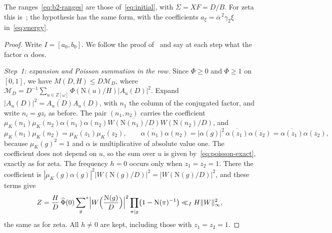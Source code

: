 \documentclass[11pt]{article}
\numberwithin{equation}{section}
\newcommand{\OO}{\mathbb Z[\omega]}
\newcommand{\N}{\mathrm N}
\newcommand{\muk}{\mu_K}
\newcommand{\ssum}{\sideset{}{^*}\sum}
\begin{document}
The ranges~\eqref{eq:b2-ranges} are those of~\eqref{eq:initial}, with $\Sigma=XF=D/B$.
For zeta this is~\cite[Proposition~4.5]{OAI1112}; the hypothesis has the same form, with the
coefficients $a_\xi=\overline\alpha^{\,2}\gamma_2\xi$ in~\eqref{eq:energy}.

\begin{proof}
Write $I=[a_0,b_0]$. We follow the proof of~\cite[Proposition~4.5]{OAI1112} and say at each
step what the factor $\alpha$ does.

\emph{Step~1: expansion and Poisson summation in the row.} Since $\Phi\ge0$ and $\Phi\ge1$
on $[0,1]$, we have $M(D,H)\le D\mathcal M_D$, where
$\mathcal M_D=D^{-1}\sum_{u\in\OO}\Phi(\N(u)/H)|A_u(D)|^2$. Expand
$|A_u(D)|^2=\overline{A_u(D)}A_u(D)$, with $n_1$ the column of the conjugated factor, and
write $n_i=gz_i$ as before. The pair $(n_1,n_2)$ carries the coefficient
$\muk(n_1)\muk(n_2)\overline{\alpha(n_1)}\alpha(n_2)\overline{W(\N(n_1)/D)}W(\N(n_2)/D)$, and
\begin{equation}\label{eq:d044}
 \muk(n_1)\muk(n_2)=\muk(z_1)\muk(z_2),\qquad
 \overline{\alpha(n_1)}\alpha(n_2)=|\alpha(g)|^2\,\overline{\alpha(z_1)}\alpha(z_2)
 =\overline{\alpha(z_1)}\alpha(z_2),
\end{equation}
because $\muk(g)^2=1$ and $\alpha$ is multiplicative of absolute value one. The coefficient
does not depend on $u$, so the sum over $u$ is given by~\eqref{eq:poisson-exact}, exactly
as for zeta. The frequency $h=0$ occurs only when $z_1=z_2=1$. There the coefficient is
$|\muk(g)\alpha(g)|^2|W(\N(g)/D)|^2=|W(\N(g)/D)|^2$, and these terms give
\begin{equation}\label{eq:d045}
 Z=\frac HD\,\widehat\Phi(0)\ssum_g\Bigl|W\Bigl(\frac{\N(g)}D\Bigr)\Bigr|^2
 \prod_{\pi\mid g}\bigl(1-\N(\pi)^{-1}\bigr)\ll_IH\|W\|_\infty^2,
\end{equation}
the same as for zeta. All $h\ne0$ are kept, including those with $z_1=z_2=1$.


\end{proof}
\end{document}
